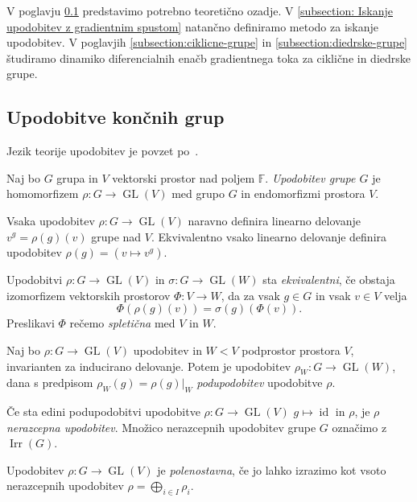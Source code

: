 \documentclass[mat2, tisk]{fmfdelo}
\begin{document}
V poglavju \ref{subsection:upodobitve končnih grup} predstavimo
potrebno teoretično ozadje. V \ref{subsection: Iskanje upodobitev
z gradientnim spustom} natančno definiramo metodo za iskanje
upodobitev. V poglavjih
\ref{subsection:ciklicne-grupe} in \ref{subsection:diedrske-grupe}
študiramo dinamiko diferencialnih enačb gradientnega toka
za ciklične in diedrske grupe.
\subsection{Upodobitve končnih grup}
\label{subsection:upodobitve končnih grup}
Jezik teorije upodobitev je povzet po~\cite{jezernik2025upodobitve}.
\begin{definicija}
  Naj bo $G$ grupa in $V$ vektorski prostor nad poljem
  $\mathbb{F}$. \emph{Upodobitev grupe $G$} je homomorfizem $
  \rho \colon G \to \operatorname{GL}(V)$ med grupo $G$ in
  endomorfizmi prostora $V$.
\end{definicija}
Vsaka upodobitev $\rho \colon G \to \operatorname{GL}(V)$ naravno
definira linearno delovanje $v ^ g = \rho(g)(v)$ grupe nad $V$.
Ekvivalentno vsako linearno delovanje  definira upodobitev
$\rho(g) = (v \mapsto v^g)$.
\begin{definicija}
  Upodobitvi $\rho \colon G \to \operatorname{GL}(V)$ in
  $\sigma \colon G \to \operatorname{GL}(W)$ sta
  \emph{ekvivalentni}, če obstaja izomorfizem vektorskih
  prostorov $\Phi \colon  V \to W$, da za vsak $g \in G$ in vsak
  $v \in V$ velja
  $$
  \Phi(\rho(g)(v)) = \sigma(g)(\Phi(v)).
  $$
  Preslikavi $\Phi$ rečemo \emph{spletična} med $V$ in $W$.
\end{definicija}
\begin{definicija}
  Naj bo $\rho: G \to \operatorname{GL}(V)$ upodobitev in $W < V$
  podprostor prostora $V$, invarianten za inducirano delovanje.
  Potem je upodobitev
  $
  \rho_W \colon G \to \operatorname{GL}(W)
  $, dana s predpisom
  $\rho_W(g) = \rho(g)|_{W}$ \emph{podupodobitev} upodobitve $\rho$.
\end{definicija}
\begin{definicija}
  Če sta edini podupodobitvi upodobitve $\rho \colon G \to
  \operatorname{GL}(V)$ $g \mapsto \operatorname{id}$ in $\rho$,
  je $\rho$ \emph{nerazcepna upodobitev}.
  Množico nerazcepnih upodobitev grupe $G$ označimo z
  $\operatorname{Irr}(G)$.
\end{definicija}
\begin{definicija}
  Upodobitev $\rho \colon G \to \operatorname{GL}(V)$ je
  \emph{polenostavna}, če jo lahko izrazimo kot vsoto nerazcepnih
  upodobitev $\rho = \bigoplus _{i \in I} \rho_i$.
\end{definicija}
\end{document}
